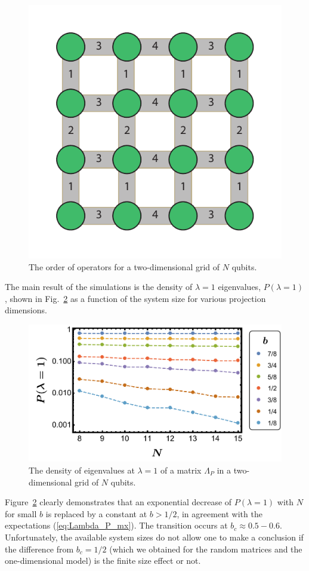 \documentclass[%
 reprint,
 superscriptaddress,
 amsmath,amssymb,
prx,
]{revtex4-2}\href{\href{}{}}{}
\begin{document}
\begin{figure}[hbt!] 
	\includegraphics[width = 0.5\columnwidth]{2Dorder_noblank.pdf}
	\caption{The order of operators for a two-dimensional grid of $N$ qubits.
	}
	\label{fig:Order}
\end{figure}
The main result of the simulations is the density of $\lambda=1$ eigenvalues, $P(\lambda=1)$, shown in Fig.~\ref{fig:P_lambda} as a function of the system size for various projection dimensions.
\begin{figure}[hbt!] 
	\includegraphics[width = 0.95\columnwidth]{2D_P_lambda_1.pdf}
	\caption{The density of eigenvalues at $\lambda=1$ of a matrix $\Lambda_P$ in a two-dimensional grid of $N$ qubits.
	}
	\label{fig:P_lambda}
\end{figure}
Figure~\ref{fig:P_lambda} clearly demonstrates that an exponential decrease of $P(\lambda=1)$ with $N$ for small $b$ is replaced by a constant at $b>1/2$, in agreement with the expectations (\ref{eq:Lambda_P_mx}). The transition occurs at $b_c\approx0.5-0.6$. Unfortunately, the available system sizes do not allow one to make a conclusion if the difference from $b_c=1/2$ (which we obtained for the random matrices and the one-dimensional model) is the finite size effect or not. 
\end{document}
